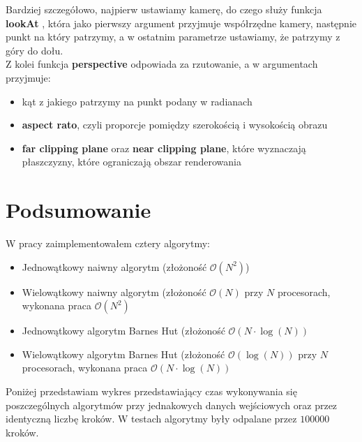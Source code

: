 \documentclass[14pt,twoside,a4paper]{article}
\theoremstyle{definition}
\begin{document}
Bardziej szczegółowo, najpierw ustawiamy kamerę, do czego służy funkcja \textbf{lookAt} \cite{opengl}, która jako pierwszy argument przyjmuje współrzędne kamery, następnie punkt na który patrzymy, a w ostatnim parametrze ustawiamy, że patrzymy z góry do dołu.\\
Z kolei funkcja \textbf{perspective} \cite{opengl} odpowiada za rzutowanie, a w argumentach przyjmuje:
\begin{itemize}
\item kąt z jakiego patrzymy na punkt podany w radianach
\item \textbf{aspect rato}, czyli proporcje pomiędzy szerokością i wysokością obrazu
\item \textbf{far clipping plane} oraz \textbf{near clipping plane}, które wyznaczają płaszczyzny, które ograniczają obszar renderowania
\end{itemize} 

\newpage

\section{\LARGE Podsumowanie}

W pracy zaimplementowałem cztery algorytmy:
\begin{itemize}
\item Jednowątkowy naiwny algorytm (złożoność $\mathcal{O}(N^{2})$)
\item Wielowątkowy naiwny algorytm (złożoność $\mathcal{O}(N) $ przy $N$ procesorach, wykonana praca $\mathcal{O}(N^{2})$
\item Jednowątkowy algorytm Barnes Hut (złożoność $\mathcal{O}(N\cdot \log(N))$
\item Wielowątkowy algorytm Barnes Hut (złożoność $\mathcal{O}(\log(N))$ przy $N$ procesorach, wykonana praca $\mathcal{O}(N\cdot \log(N))$
\end{itemize}

Poniżej przedstawiam wykres przedstawiający czas wykonywania się poszczególnych algorytmów przy jednakowych danych wejściowych oraz przez identyczną liczbę kroków. W testach algorytmy były odpalane przez $100000$ kroków.
\end{document}
